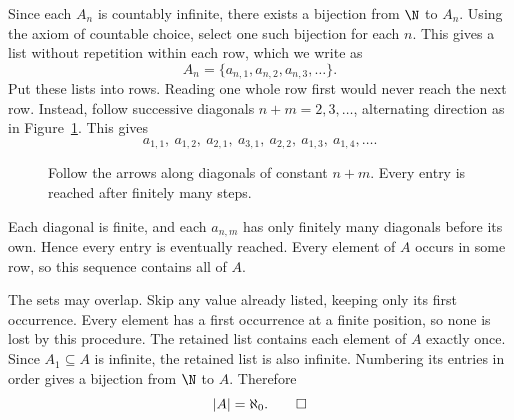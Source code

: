 Since each $A_n$ is countably infinite, there exists a bijection
from $\N$ to $A_n$. Using the axiom of countable choice, select
one such bijection for each $n$. This gives a list without
repetition within each row, which we write as
\[
  A_n=\{a_{n,1},a_{n,2},a_{n,3},\ldots\}.
\]
Put these lists into rows. Reading one whole row first would
never reach the next row. Instead, follow successive diagonals
$n+m=2,3,\ldots$, alternating direction as in
Figure~\ref{fig:hw01:diagonal-enumeration}. This gives
\[
  a_{1,1},\ a_{1,2},\ a_{2,1},\ a_{3,1},
  \ a_{2,2},\ a_{1,3},\ a_{1,4},\ldots.
\]

\begin{figure}[h]
  \centering
  
  \caption{Follow the arrows along diagonals of constant $n+m$.
    Every entry is reached after finitely many steps.}
  \label{fig:hw01:diagonal-enumeration}
\end{figure}

Each diagonal is finite, and each $a_{n,m}$ has only finitely
many diagonals before its own. Hence every entry is eventually
reached. Every element of $A$ occurs in some row, so this sequence
contains all of $A$.

The sets may overlap. Skip any value already listed, keeping only
its first occurrence. Every element has a first occurrence at
a finite position, so none is lost by this procedure. The
retained list contains each element of $A$ exactly once.
Since $A_1\subseteq A$ is infinite, the retained list is also
infinite. Numbering its entries in order gives a bijection
from $\N$ to $A$. Therefore
\[
  |A|=\aleph_0.\qedhere
\]
